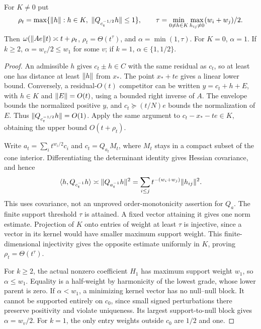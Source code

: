 \begin{proposition}\label{prop:dikin}
For $K\ne0$ put
\[
 \rho_t=\max\{\norm h:h\in K,\ \norm{Q_{c_t^{-1/2}}h}\le1\},
 \qquad
 \tau=\min_{0\ne h\in K}\max_{h_{ij}\ne0}(w_i+w_j)/2.
\]
Then $\omega(\lVert Ae\rVert t)\asymp t+\rho_t$, $\rho_t=\Theta(t^\tau)$, and $\alpha=\min(1,\tau)$. For $K=0$, $\alpha=1$. If $k\ge2$, $\alpha=w_v/2\le w_1$ for some $v$; if $k=1$, $\alpha\in\{1,1/2\}$.
\end{proposition}
\begin{proof}
An admissible $h$ gives $c_t\pm h\in C$ with the same residual as $c_t$, so at least one has distance at least $\lVert h\rVert$ from $x_*$. The point $x_*+te$ gives a linear lower bound. Conversely, a residual-$O(t)$ competitor can be written $y=c_t+h+E$, with $h\in K$ and $\lVert E\rVert=O(t)$, using a bounded right inverse of $A$. The envelope bounds the normalized positive $y$, and $c_t\succeq(t/N)e$ bounds the normalization of $E$. Thus $\lVert Q_{c_t^{-1/2}}h\rVert=O(1)$. Apply the same argument to $c_t-x_*-te\in K$, obtaining the upper bound $O(t+\rho_t)$.

Write $a_t=\sum_i t^{w_i/2}c_i$ and $c_t=Q_{a_t}M_t$, where $M_t$ stays in a compact subset of the cone interior. Differentiating the determinant identity gives Hessian covariance, and hence
\begin{equation}\label{eq:hessian}
 \langle h,Q_{c_t^{-1}}h\rangle\asymp\lVert Q_{a_t^{-1}}h\rVert^2
 =\sum_{i\le j}t^{-(w_i+w_j)}\lVert h_{ij}\rVert^2.
\end{equation}
This uses covariance, not an unproved order-monotonicity assertion for $Q_a$. The finite support threshold $\tau$ is attained. A fixed vector attaining it gives one norm estimate. Projection of $K$ onto entries of weight at least $\tau$ is injective, since a vector in its kernel would have smaller maximum support weight. This finite-dimensional injectivity gives the opposite estimate uniformly in $K$, proving $\rho_t=\Theta(t^\tau)$.

For $k\ge2$, the actual nonzero coefficient $H_1$ has maximum support weight $w_1$, so $\alpha\le w_1$. Equality is a half-weight by harmonicity of the lowest grade, whose lower parent is zero. If $\alpha<w_1$, a minimizing kernel vector has no null--null block. It cannot be supported entirely on $c_0$, since small signed perturbations there preserve positivity and violate uniqueness. Its largest support-to-null block gives $\alpha=w_v/2$. For $k=1$, the only entry weights outside $c_0$ are $1/2$ and one.
\end{proof}

